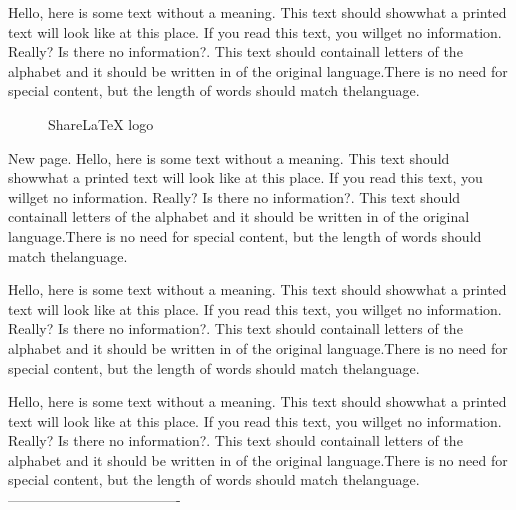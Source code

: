 \documentclass{article}
\begin{document}
Hello,  here  is  some  text  without  a  meaning.   This  text  should  showwhat a printed text will look like at this place.  If you read this text, you willget  no  information.   Really?   Is  there  no  information?.  This text should containall letters of the alphabet and it should be written in of the original language.There is no need for special content, but the length of words should match thelanguage.

\begin{figure}
\centering
\caption{ShareLaTeX logo}
\end{figure}

\newpage %

New page. Hello,  here  is  some  text  without  a  meaning.   This  text  should  showwhat a printed text will look like at this place.  If you read this text, you willget  no  information.   Really?   Is  there  no  information?.  This text should containall letters of the alphabet and it should be written in of the original language.There is no need for special content, but the length of words should match thelanguage.

Hello,  here  is  some  text  without  a  meaning.   This  text  should  showwhat a printed text will look like at this place.  If you read this text, you willget  no  information.   Really?   Is  there  no  information?.  This text should containall letters of the alphabet and it should be written in of the original language.There is no need for special content, but the length of words should match thelanguage.

Hello,  here  is  some  text  without  a  meaning.   This  text  should  showwhat a printed text will look like at this place.  If you read this text, you willget  no  information.   Really?   Is  there  no  information?.  This text should containall letters of the alphabet and it should be written in of the original language.There is no need for special content, but the length of words should match thelanguage.
-------------------------------------
\end{document}
